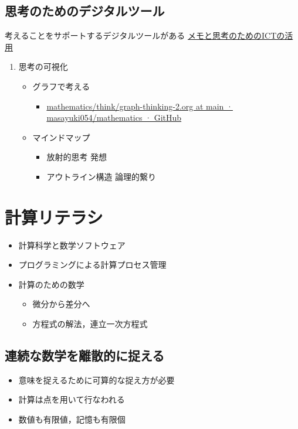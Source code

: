 \documentclass[dvipdfmx,11pat]{jarticle}
\begin{document}
\subsection{思考のためのデジタルツール}
\label{sec:org6339e07}
考えることをサポートするデジタルツールがある \href{https://masayuki054.github.io/ict\_literacy\_for\_thinking\_and\_memo/}{メモと思考のためのICTの活用}
\begin{enumerate}
\item 思考の可視化
\label{sec:orga5a0eaf}
\begin{itemize}
\item グラフで考える
\begin{itemize}
\item \href{https://github.com/masayuki054/mathematics/blob/main/think/graph-thinking-2.org}{mathematics/think/graph-thinking-2.org at main · masayuki054/mathematics · GitHub}
\end{itemize}
\item マインドマップ
\begin{itemize}
\item 放射的思考 発想
\item アウトライン構造 論理的繋り
\end{itemize}
\end{itemize}
\end{enumerate}
\section{計算リテラシ}
\label{sec:orgc595b4c}
\begin{itemize}
\item 計算科学と数学ソフトウェア
\item プログラミングによる計算プロセス管理
\item 計算のための数学
\begin{itemize}
\item 微分から差分へ
\item 方程式の解法，連立一次方程式
\end{itemize}
\end{itemize}
\subsection{連続な数学を離散的に捉える}
\label{sec:org5758170}
\begin{itemize}
\item 意味を捉えるために可算的な捉え方が必要
\item 計算は点を用いて行なわれる
\item 数値も有限値，記憶も有限個
\end{itemize}
\end{document}
